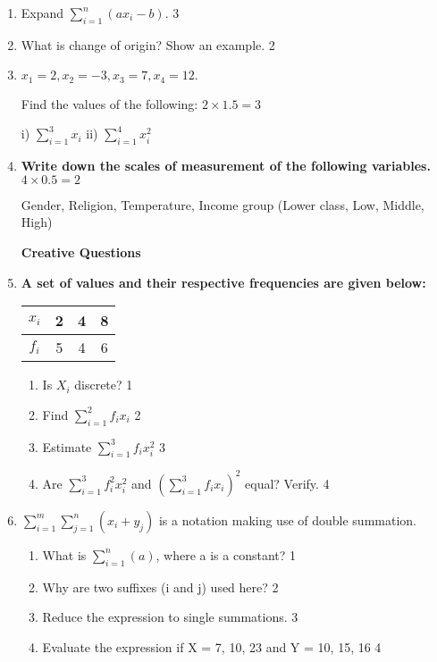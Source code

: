 \documentclass{exam}
\begin{document}
\begin{enumerate}

\item Expand $\displaystyle \sum_{i=1}^n \left( ax_i-b \right)$. \hfill 3

\item What is change of origin? Show an example.  \hfill 2

    \item
	$x_1=2, x_2=-3, x_3=7, x_4=12.$ 
	
	Find the values of the following: \hfill $2 \times 1.5 = 3$
	
	i) $\displaystyle \sum_{i=1}^3 x_i$ 
	ii) $\displaystyle \sum_{i=1}^4 x_i^2$

	\item \textbf{Write down the scales of measurement of the following variables.} \hfill $4 \times 0.5 = 2$

	Gender, Religion, Temperature, Income group (Lower class, Low, Middle, High)



 \vspace{0.5cm}
 
 \textbf{Creative Questions}

 \item
	  \textbf{A set of values and their respective frequencies are given below:}
	  
\begin{table}[h]
\centering
\begin{tabular}{c|c|c|c}
$x_i$ & 2 & 4 & 8 \\ \hline
$f_i$ & 5 & 4 & 6
\end{tabular}
\end{table}
  
  \begin{enumerate}
    \item
	Is $X_i$ discrete? \hfill 1
    \item
	Find $\displaystyle \sum_{i=1}^2 f_ix_i$ \hfill 2
    \item  
	Estimate $\displaystyle \sum_{i=1}^3 f_ix_i^2$ \hfill 3
    \item
	Are $\displaystyle \sum_{i=1}^3 f_i^2x_i^2$ and $\displaystyle (\sum_{i=1}^3 f_ix_i)^2$ equal? Verify. \hfill 4
  \end{enumerate}

 \item
	  \textbf{$\displaystyle  \sum_{i=1}^m \sum_{j=1}^n (x_i+y_j)$} is a notation
	  making use of double summation. 
  
  \begin{enumerate}
    \item
	What is $\displaystyle \sum_{i=1}^n (a)$, where a is a constant? \hfill 1
    \item
	Why are two suffixes (i and j) used here? \hfill 2
    \item  
	Reduce the expression to single summations. \hfill 3
    \item
	Evaluate the expression if X = 7, 10, 23 and Y = 10, 15, 16 \hfill 4
  \end{enumerate}


\end{enumerate}
\end{document}
